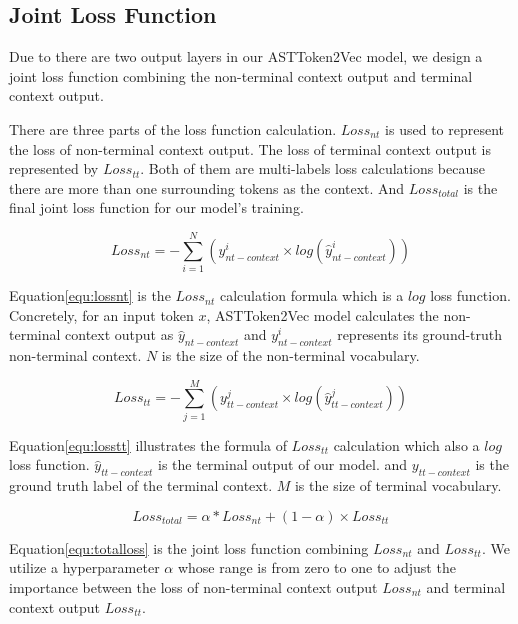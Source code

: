 \documentclass[E]{compsoft}
\begin{document}
\subsection{Joint Loss Function}
Due to there are two output layers in our ASTToken2Vec model, we design a joint loss function combining the non-terminal context output and terminal context output. 

There are three parts of the loss function calculation. 
$Loss_{nt}$ is used to represent the loss of non-terminal context output. 
The loss of terminal context output is represented by $Loss_{tt}$. 
Both of them are multi-labels loss calculations because there are more than one surrounding tokens as the context. 
And $Loss_{total}$ is the final joint loss function for our model's training.

\begin{equation}
Loss_{nt} = -\sum_{i=1}^{N}(y_{nt-context}^{i} \times log(\hat{y}_{nt-context}^{i}))\label{equ:lossnt}
\end{equation}

Equation\ref{equ:lossnt} is the $Loss_{nt}$ calculation formula which is a $log$ loss function. 
Concretely, for an input token $x$, ASTToken2Vec model calculates the non-terminal context output as $\hat{y}_{nt-context}$ and $y_{nt-context}^{i}$ represents its ground-truth non-terminal context.
$N$ is the size of the non-terminal vocabulary. 


\begin{equation}
Loss_{tt} = -\sum_{j=1}^{M} (y_{tt-context}^{j} \times log(\hat{y}_{tt-context}^{j}))\label{equ:losstt}
\end{equation}

Equation\ref{equ:losstt} illustrates the formula of $Loss_{tt}$ calculation which also a $log$ loss function. 
$\hat{y}_{tt-context}$ is the terminal output of our model. and $y_{tt-context}$ is the ground truth label of the terminal context.
$M$ is the size of terminal vocabulary.

\begin{equation}
Loss_{total} = \alpha * Loss_{nt} + (1-\alpha) \times Loss_{tt}\label{equ:totalloss}
\end{equation}

Equation\ref{equ:totalloss} is the joint loss function combining $Loss_{nt}$ and $Loss_{tt}$. 
We utilize a hyperparameter $\alpha$ whose range is from zero to one to adjust the importance between the loss of non-terminal context output $Loss_{nt}$ and terminal context output $Loss_{tt}$.
\end{document}

